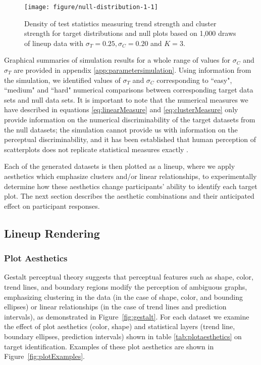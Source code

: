 \documentclass[12pt]{article}\usepackage[]{graphicx}\usepackage[]{color}
\makeatletter
\def\maxwidth{ %
  \ifdim\Gin@nat@width>\linewidth
    \linewidth
  \else
    \Gin@nat@width
  \fi
}
\newenvironment{knitrout}{}{} %
\newcommand{\newdo}[1]{\todo[inline, color=Lime]{#1}} %
\makeatother
\begin{document}
\begin{figure}[ht]
\centering
\begin{knitrout}
\color{fgcolor}

{\centering \texttt{[image: figure/null-distribution-1-1]} 

}



\end{knitrout}
\caption[Simulation-based test statistic density for null and target plots]{\label{fig:targetsignal-0}Density of test statistics measuring trend strength and cluster strength for target distributions and null plots based on 1,000 draws of lineup data with $\sigma_T= 0.25, \sigma_C=0.20$ and $K=3$. }
\end{figure}

Graphical summaries of simulation results for a whole range of values for $\sigma_C$ and $\sigma_T$ are provided in appendix \ref{app:parametersimulation}. Using information from the simulation, we identified values of $\sigma_T$ and $\sigma_C$ corresponding to ``easy", ``medium" and ``hard" numerical comparisons between corresponding target data sets and null data sets. It is important to note that the numerical measures we have described in equations \eqref{eq:linearMeasure} and \eqref{eq:clusterMeasure} only provide information on the numerical discriminability of the target datasets from the null datasets; the simulation cannot provide us with information on the perceptual discriminability, and it has been established that human perception of scatterplots does not replicate statistical measures exactly \citep{bobko1979perception, mosteller1981eye, lewandowsky1989perception}.

Each of the generated datasets is then plotted as a lineup, where we apply aesthetics which emphasize clusters and/or linear relationships, to experimentally determine how these aesthetics change participants' ability to identify each target plot. The next section describes the aesthetic combinations and their anticipated effect on participant responses. 

\subsection{Lineup Rendering}
\subsubsection{Plot Aesthetics}
Gestalt perceptual theory suggests that perceptual features such as shape, color, trend lines, and boundary regions modify the perception of ambiguous graphs, emphasizing clustering in the data (in the case of shape, color, and bounding ellipses) or linear relationships (in the case of trend lines and prediction intervals), as demonstrated in Figure~\ref{fig:gestalt}. For each dataset we examine the effect of plot aesthetics (color, shape) and statistical layers (trend line, boundary ellipses, prediction intervals) shown in table \ref{tab:plotaesthetics}  on target identification. Examples of these plot aesthetics are shown in Figure~\ref{fig:plotExamples}.
\end{document}
